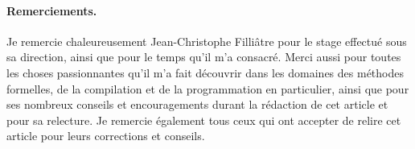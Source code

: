 \documentclass[a4paper]{easychair}
\begin{document}

\paragraph{Remerciements.} Je remercie chaleureusement Jean-Christophe
Filliâtre pour le stage effectué sous sa direction, ainsi que pour le
temps qu'il m'a consacré.
Merci aussi pour toutes les choses passionnantes qu'il m'a fait découvrir
dans les domaines des méthodes formelles, de la compilation et de la
programmation en particulier, ainsi que pour ses nombreux conseils et
encouragements durant la rédaction de cet article et pour sa relecture.
Je remercie également tous ceux qui ont accepter de relire cet article pour
leurs corrections et conseils.




\end{document}
